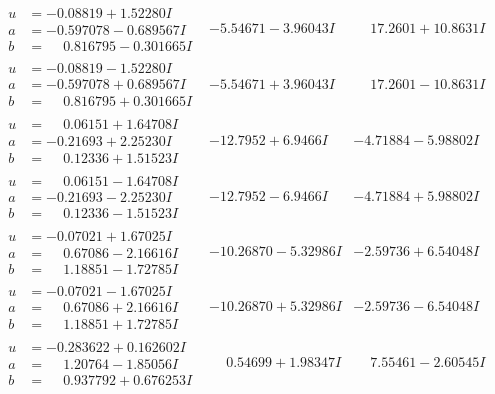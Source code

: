 \documentclass[1p]{elsarticle_modified}
\theoremstyle{definition}
\begin{document}
$$\begin{array}{c|c|c}
\begin{aligned}
u &= -0.08819 + 1.52280 I \\
a &= -0.597078 - 0.689567 I \\
b &= \phantom{-}0.816795 - 0.301665 I\end{aligned}
 & -5.54671 - 3.96043 I & \phantom{-}17.2601 + 10.8631 I \\ \hline\begin{aligned}
u &= -0.08819 - 1.52280 I \\
a &= -0.597078 + 0.689567 I \\
b &= \phantom{-}0.816795 + 0.301665 I\end{aligned}
 & -5.54671 + 3.96043 I & \phantom{-}17.2601 - 10.8631 I \\ \hline\begin{aligned}
u &= \phantom{-}0.06151 + 1.64708 I \\
a &= -0.21693 + 2.25230 I \\
b &= \phantom{-}0.12336 + 1.51523 I\end{aligned}
 & -12.7952 + 6.9466 I & -4.71884 - 5.98802 I \\ \hline\begin{aligned}
u &= \phantom{-}0.06151 - 1.64708 I \\
a &= -0.21693 - 2.25230 I \\
b &= \phantom{-}0.12336 - 1.51523 I\end{aligned}
 & -12.7952 - 6.9466 I & -4.71884 + 5.98802 I \\ \hline\begin{aligned}
u &= -0.07021 + 1.67025 I \\
a &= \phantom{-}0.67086 - 2.16616 I \\
b &= \phantom{-}1.18851 - 1.72785 I\end{aligned}
 & -10.26870 - 5.32986 I & -2.59736 + 6.54048 I \\ \hline\begin{aligned}
u &= -0.07021 - 1.67025 I \\
a &= \phantom{-}0.67086 + 2.16616 I \\
b &= \phantom{-}1.18851 + 1.72785 I\end{aligned}
 & -10.26870 + 5.32986 I & -2.59736 - 6.54048 I \\ \hline\begin{aligned}
u &= -0.283622 + 0.162602 I \\
a &= \phantom{-}1.20764 - 1.85056 I \\
b &= \phantom{-}0.937792 + 0.676253 I\end{aligned}
 & \phantom{-}0.54699 + 1.98347 I & \phantom{-}7.55461 - 2.60545 I \\ \hline\begin{aligned}

\end{aligned}
\end{array}$$
\end{document}
